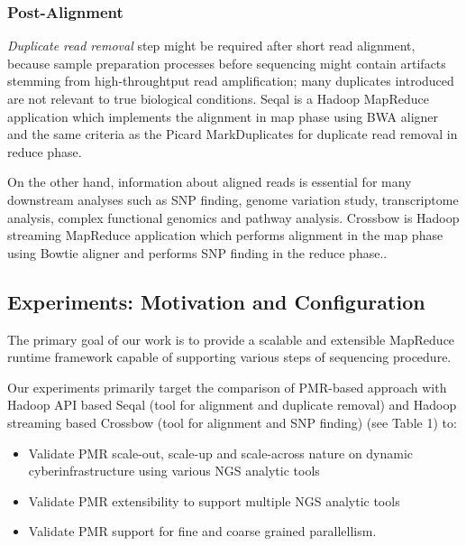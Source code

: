 \documentclass{acm_proc_article-sp}
\begin{document}
\subsubsection{Post-Alignment}
\textit{Duplicate read removal} step might be required  after short read alignment, because sample preparation processes before sequencing might contain artifacts stemming from high-throughtput read amplification; many duplicates introduced are not relevant to true biological conditions. Seqal is a Hadoop MapReduce application which implements the alignment in map phase using BWA aligner and the same criteria as the Picard MarkDuplicates\cite{seal2011,seal_2011_mapred} for duplicate read removal in reduce phase.

On the other hand, information about aligned reads is essential for many downstream analyses such as SNP finding, genome variation study, transcriptome analysis, complex functional genomics and pathway analysis.
Crossbow is Hadoop streaming MapReduce application which performs alignment in the map phase using Bowtie aligner and  performs SNP finding in the reduce phase.\cite{langmead2009}. 


\subsection{Experiments: Motivation and Configuration}

The primary goal of our work is to provide a scalable and extensible
MapReduce runtime framework capable of supporting various steps of
sequencing procedure.

Our experiments primarily target the comparison of PMR-based approach
with Hadoop API based Seqal (tool for alignment and duplicate removal)
and Hadoop streaming based Crossbow (tool for alignment and SNP
finding) (see Table 1) to:
\begin{itemize}
\item{Validate PMR scale-out, scale-up and scale-across nature on dynamic cyberinfrastructure using various NGS analytic tools}
\item{Validate PMR extensibility to support multiple NGS analytic tools}
\item{Validate PMR support for fine and coarse grained parallellism}.
\end{itemize}
\end{document}
